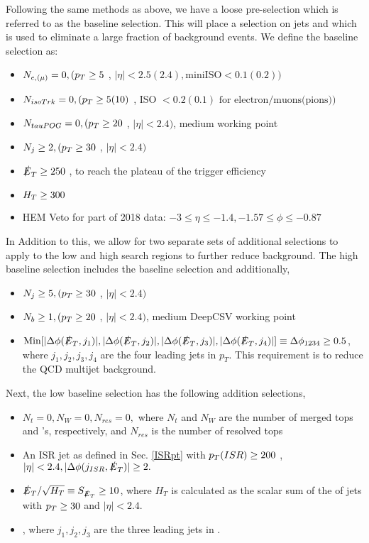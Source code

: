 Following the same methods as above, we have a loose pre-selection which is referred to as the baseline selection. This will place a selection on jets and \met{} which is used to eliminate a large fraction of background events. We define the baseline selection as:
\begin{itemize}
	\item $N_{e,(\mu)} = 0, (p_{T}\geq5$ \GeV, $|\eta|<2.5(2.4), \text{miniISO}<0.1(0.2))$
	\item $N_{isoTrk} = 0, (p_{T}\geq5 (10)$ \GeV, ISO $< 0.2(0.1) \text{ for electron/muons(pions)})$
	\item $N_{tauPOG} = 0, (p_{T}\geq20$ \GeV, $|\eta|<2.4)$, medium working point
	\item $N_{j} \geq 2, (p_{T}\geq30$ \GeV, $|\eta|<2.4)$
	\item $\slashed{E}_{T}\geq250$ \GeV, to reach the plateau of the trigger efficiency
	\item $H_{T}\geq300$ \GeV
	\item HEM Veto for part of 2018 data: $-3\leq\eta\leq-1.4, -1.57\leq\phi\leq-0.87$
\end{itemize}
In Addition to this, we allow for two separate sets of additional selections to apply to the low and high \dm{} search regions to further reduce background. The high \dm{} baseline selection includes the baseline selection and additionally,
\begin{itemize}
	\item $N_j\geq 5, (p_{T} \geq30$ \GeV, $|\eta|<2.4)$
	\item $N_b\geq 1, (p_{T}\geq20$ \GeV, $|\eta|<2.4)$, medium DeepCSV working point
	\item $\text{Min}[|\Delta\phi(\slashed{E}_{T},j_1)|,|\Delta\phi(\slashed{E}_{T},j_2)|,|\Delta\phi(\slashed{E}_{T},j_3)|,|\Delta\phi(\slashed{E}_{T},j_4)|]\equiv\Delta\phi_{1234}\geq0.5$, where $j_1, j_2, j_3, j_4$ are the four leading jets in $p_T$. This requirement is to reduce the QCD multijet background. 
\end{itemize}
Next, the low \dm{} baseline selection has the following addition selections,
\begin{itemize}
	\item $N_t=0, N_W=0,N_{res}=0,$ where $N_t$ and $N_W$ are the number of merged tops and \W's, respectively, and $N_{res}$ is the number of resolved tops
	\item An ISR jet as defined in Sec. \ref{ISRpt} with $p_{T}(ISR)\geq200$ \GeV, $|\eta|<2.4, |\Delta\phi(j_{ISR},\slashed{E}_{T})|\geq2.$
	\item $\slashed{E}_{T}/\sqrt{H_{T}}\equiv S_{\slashed{E}_{T}}\geq10$, where $H_T$ is calculated as the scalar sum of the \pt of jets with $p_{T}\geq30$ \GeV{} and $|\eta|<2.4.$
	\item \lowdm, where $j_1,j_2,j_3$ are the three leading jets in \pt. 
\end{itemize}

